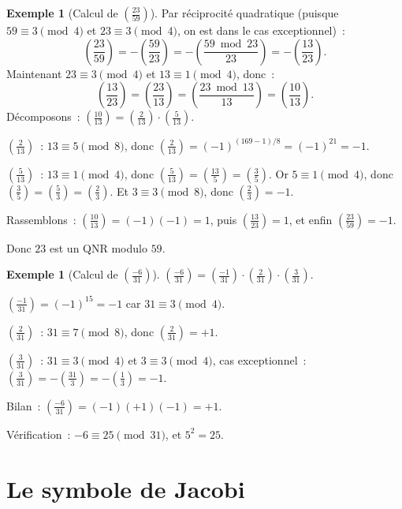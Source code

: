 \documentclass[12pt,a4paper,openany]{book}
\theoremstyle{definition}
\newtheorem{exemple}[definition]{Exemple}
\theoremstyle{plain}
\theoremstyle{remark}
\newcommand{\legendre}[2]{\left(\frac{#1}{#2}\right)}
\begin{document}
\begin{exemple}[Calcul de $\legendre{23}{59}$]
\label{ex:legendre-23-59}
Par réciprocité quadratique (puisque $59 \equiv 3 \pmod{4}$ et $23 \equiv 3 \pmod{4}$,
on est dans le cas exceptionnel)~:
\[
  \legendre{23}{59} = -\legendre{59}{23} = -\legendre{59 \bmod 23}{23}
  = -\legendre{13}{23}.
\]
Maintenant $23 \equiv 3 \pmod{4}$ et $13 \equiv 1 \pmod{4}$, donc~:
\[
  \legendre{13}{23} = \legendre{23}{13} = \legendre{23 \bmod 13}{13}
  = \legendre{10}{13}.
\]
Décomposons~: $\legendre{10}{13} = \legendre{2}{13} \cdot \legendre{5}{13}$.

$\legendre{2}{13}$~: $13 \equiv 5 \pmod{8}$, donc $\legendre{2}{13} = (-1)^{(169-1)/8} = (-1)^{21} = -1$.

$\legendre{5}{13}$~: $13 \equiv 1 \pmod{4}$, donc $\legendre{5}{13} = \legendre{13}{5} = \legendre{3}{5}$.
Or $5 \equiv 1 \pmod{4}$, donc $\legendre{3}{5} = \legendre{5}{3} = \legendre{2}{3}$.
Et $3 \equiv 3 \pmod{8}$, donc $\legendre{2}{3} = -1$.

Rassemblons~: $\legendre{10}{13} = (-1)(-1) = 1$, puis
$\legendre{13}{23} = 1$, et enfin $\legendre{23}{59} = -1$.

Donc $23$ est un QNR modulo $59$.
\end{exemple}

\begin{exemple}[Calcul de $\legendre{-6}{31}$]
\label{ex:legendre--6-31}
$\legendre{-6}{31} = \legendre{-1}{31} \cdot \legendre{2}{31} \cdot \legendre{3}{31}$.

$\legendre{-1}{31} = (-1)^{15} = -1$ car $31 \equiv 3 \pmod{4}$.

$\legendre{2}{31}$~: $31 \equiv 7 \pmod{8}$, donc $\legendre{2}{31} = +1$.

$\legendre{3}{31}$~: $31 \equiv 3 \pmod{4}$ et $3 \equiv 3 \pmod{4}$, cas exceptionnel~:
$\legendre{3}{31} = -\legendre{31}{3} = -\legendre{1}{3} = -1$.

Bilan~: $\legendre{-6}{31} = (-1)(+1)(-1) = +1$.

Vérification~: $-6 \equiv 25 \pmod{31}$, et $5^2 = 25$. \checkmark
\end{exemple}

\section{Le symbole de Jacobi}
\label{sec:qr:jacobi}
\end{document}

